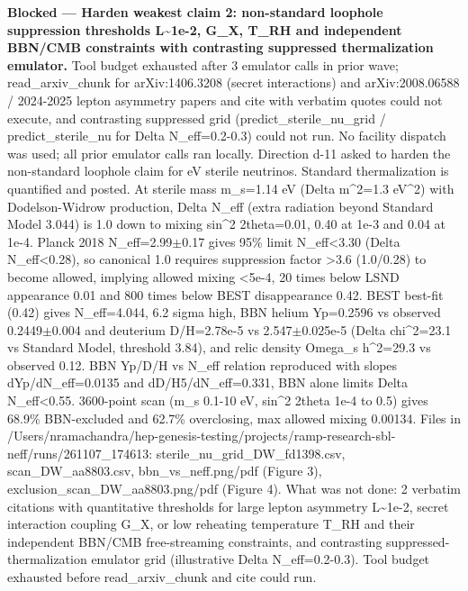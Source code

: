 \documentclass[11pt,a4paper]{article}
\begin{document}
\textbf{Blocked --- Harden weakest claim 2: non-standard loophole suppression thresholds L\textasciitilde{}1e-2, G\_X, T\_RH and independent BBN/CMB constraints with contrasting suppressed thermalization emulator.} Tool budget exhausted after 3 emulator calls in prior wave; read\_arxiv\_chunk for arXiv:1406.3208 (secret interactions) and arXiv:2008.06588 / 2024-2025 lepton asymmetry papers and cite with verbatim quotes could not execute, and contrasting suppressed grid (predict\_sterile\_nu\_grid / predict\_sterile\_nu for Delta N\_eff=0.2-0.3) could not run. No facility dispatch was used; all prior emulator calls ran locally. Direction d-11 asked to harden the non-standard loophole claim for eV sterile neutrinos. Standard thermalization is quantified and posted. At sterile mass m\_s=1.14 eV (Delta m\textasciicircum{}2=1.3 eV\textasciicircum{}2) with Dodelson-Widrow production, Delta N\_eff (extra radiation beyond Standard Model 3.044) is 1.0 down to mixing sin\textasciicircum{}2 2theta=0.01, 0.40 at 1e-3 and 0.04 at 1e-4. Planck 2018 N\_eff=2.99$\pm$0.17 gives 95\% limit N\_eff\textless{}3.30 (Delta N\_eff\textless{}0.28), so canonical 1.0 requires suppression factor \textgreater{}3.6 (1.0/0.28) to become allowed, implying allowed mixing \textless{}5e-4, 20 times below LSND appearance 0.01 and 800 times below BEST disappearance 0.42. BEST best-fit (0.42) gives N\_eff=4.044, 6.2 sigma high, BBN helium Yp=0.2596 vs observed 0.2449$\pm$0.004 and deuterium D/H=2.78e-5 vs 2.547$\pm$0.025e-5 (Delta chi\textasciicircum{}2=23.1 vs Standard Model, threshold 3.84), and relic density Omega\_s h\textasciicircum{}2=29.3 vs observed 0.12. BBN Yp/D/H vs N\_eff relation reproduced with slopes dYp/dN\_eff=0.0135 and dD/H5/dN\_eff=0.331, BBN alone limits Delta N\_eff\textless{}0.55. 3600-point scan (m\_s 0.1-10 eV, sin\textasciicircum{}2 2theta 1e-4 to 0.5) gives 68.9\% BBN-excluded and 62.7\% overclosing, max allowed mixing 0.00134. Files in /Users/nramachandra/hep-genesis-testing/projects/ramp-research-sbl-neff/runs/261107\_174613: sterile\_nu\_grid\_DW\_fd1398.csv, scan\_DW\_aa8803.csv, bbn\_vs\_neff.png/pdf (Figure 3), exclusion\_scan\_DW\_aa8803.png/pdf (Figure 4). What was not done: 2 verbatim citations with quantitative thresholds for large lepton asymmetry L\textasciitilde{}1e-2, secret interaction coupling G\_X, or low reheating temperature T\_RH and their independent BBN/CMB free-streaming constraints, and contrasting suppressed-thermalization emulator grid (illustrative Delta N\_eff=0.2-0.3). Tool budget exhausted before read\_arxiv\_chunk and cite could run.
\end{document}
